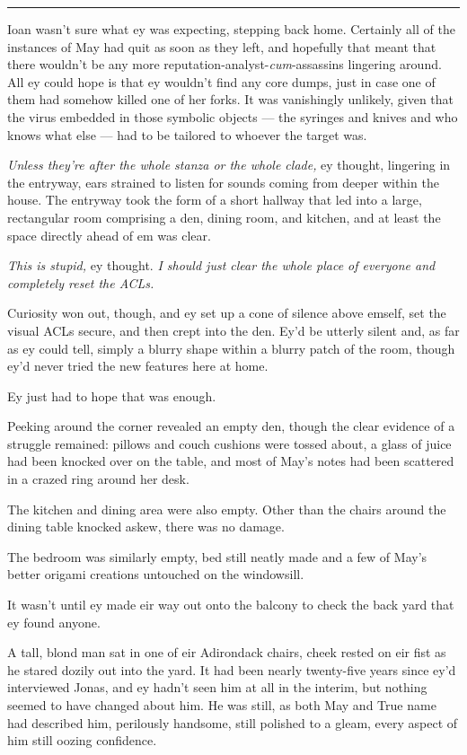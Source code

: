 \begin{center}\rule{0.5\linewidth}{0.5pt}\end{center}

Ioan wasn't sure what ey was expecting, stepping back home. Certainly all of the instances of May had quit as soon as they left, and hopefully that meant that there wouldn't be any more reputation-analyst-\emph{cum}-assassins lingering around. All ey could hope is that ey wouldn't find any core dumps, just in case one of them had somehow killed one of her forks. It was vanishingly unlikely, given that the virus embedded in those symbolic objects — the syringes and knives and who knows what else — had to be tailored to whoever the target was.

\emph{Unless they're after the whole stanza or the whole clade,} ey thought, lingering in the entryway, ears strained to listen for sounds coming from deeper within the house. The entryway took the form of a short hallway that led into a large, rectangular room comprising a den, dining room, and kitchen, and at least the space directly ahead of em was clear.

\emph{This is stupid,} ey thought. \emph{I should just clear the whole place of everyone and completely reset the ACLs.}

Curiosity won out, though, and ey set up a cone of silence above emself, set the visual ACLs secure, and then crept into the den. Ey'd be utterly silent and, as far as ey could tell, simply a blurry shape within a blurry patch of the room, though ey'd never tried the new features here at home.

Ey just had to hope that was enough.

Peeking around the corner revealed an empty den, though the clear evidence of a struggle remained: pillows and couch cushions were tossed about, a glass of juice had been knocked over on the table, and most of May's notes had been scattered in a crazed ring around her desk.

The kitchen and dining area were also empty. Other than the chairs around the dining table knocked askew, there was no damage.

The bedroom was similarly empty, bed still neatly made and a few of May's better origami creations untouched on the windowsill.

It wasn't until ey made eir way out onto the balcony to check the back yard that ey found anyone.

A tall, blond man sat in one of eir Adirondack chairs, cheek rested on eir fist as he stared dozily out into the yard. It had been nearly twenty-five years since ey'd interviewed Jonas, and ey hadn't seen him at all in the interim, but nothing seemed to have changed about him. He was still, as both May and True name had described him, perilously handsome, still polished to a gleam, every aspect of him still oozing confidence.

